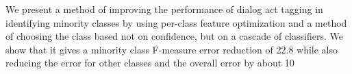 We present a method of improving the performance of dialog act tagging in identifying minority
 classes by using per-class feature optimization
 and a method of choosing the class
 based not on confidence, but on a cascade of
 classifiers. We show that it gives a minority
 class F-measure error reduction of 22.8%
 while also reducing the error for other classes
 and the overall error by about 10%

